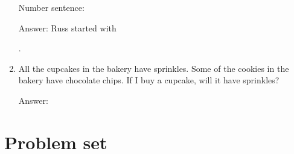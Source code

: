 \documentclass{tufte-book}
\begin{document}
\begin{enumerate}
Number sentence: \dotfill\bigskip

Answer: Russ started with \dotfill\medskip\par\mbox{}\dotfill\medskip.\par

\item All the cupcakes in the bakery have sprinkles. Some of the cookies in the bakery have chocolate chips. If I buy a cupcake, will it have sprinkles?\bigskip\par
Answer: \dotfill\bigskip

\end{enumerate}

\clearpage\section{Problem set }
\end{document}

